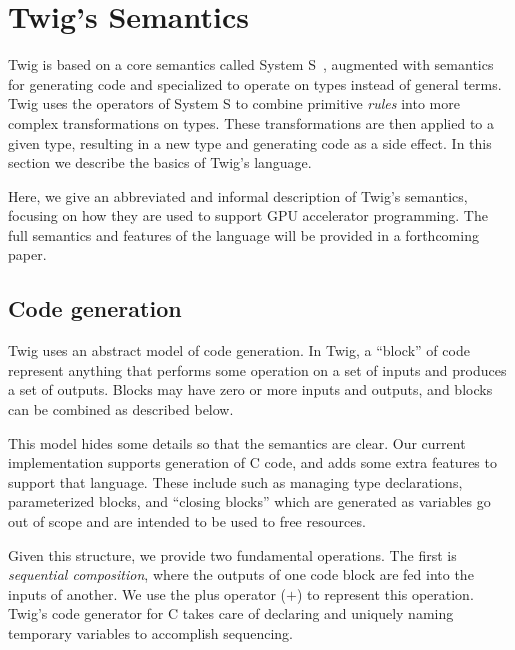 
\section{Twig's Semantics}
\label{semantics}


Twig is based on a core semantics called System S~\cite{Visser:1998p333},
augmented with semantics for generating code and specialized to operate on types
instead of general terms. Twig uses the operators of System S to combine
primitive \emph{rules} into more complex transformations on types. These
transformations are then applied to a given type, resulting in a new type and
generating code as a side effect. In this section we describe the basics of
Twig's language.

Here, we give an abbreviated and informal description of Twig's semantics,
focusing on how they are used to support GPU accelerator programming. The full
semantics and features of the language will be provided in a forthcoming paper.


\subsection{Code generation}
\label{twig:code-gen}

Twig uses an abstract model of code generation. In Twig, a ``block'' of code
represent anything that performs some operation on a set of inputs and produces
a set of outputs. Blocks may have zero or more inputs and outputs, and blocks
can be combined as described below.

This model hides some details so that the semantics are clear. Our current
implementation supports generation of C code, and adds some extra features to
support that language. These include such as managing type declarations,
parameterized blocks, and ``closing blocks'' which are generated as variables go
out of scope and are intended to be used to free resources.

Given this structure, we provide two fundamental operations. The first is
\emph{sequential composition}, where the outputs of one code block are fed into
the inputs of another. We use the plus operator ($+$) to represent this
operation. Twig's code generator for C takes care of declaring and uniquely
naming temporary variables to accomplish sequencing.

